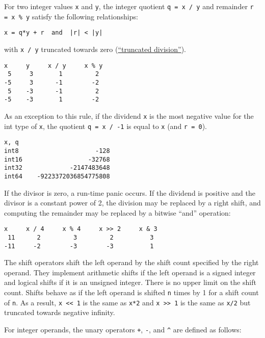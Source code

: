 For two integer values \texttt{x} and \texttt{y}, the integer quotient
\texttt{q = x / y} and remainder \texttt{r = x \% y} satisfy the
following relationships:

\begin{Verbatim}[frame=single]
x = q*y + r  and  |r| < |y|
\end{Verbatim}

with \texttt{x / y} truncated towards zero
(\href{http://en.wikipedia.org/wiki/Modulo\_operation}{``truncated
division''}).

\begin{Verbatim}[frame=single]
 x     y     x / y     x % y
 5     3       1         2
-5     3      -1        -2
 5    -3      -1         2
-5    -3       1        -2
\end{Verbatim}

As an exception to this rule, if the dividend \texttt{x} is the most
negative value for the int type of \texttt{x}, the quotient
\texttt{q = x / -1} is equal to \texttt{x} (and \texttt{r = 0}).

\begin{Verbatim}[frame=single]
             x, q
int8                     -128
int16                  -32768
int32             -2147483648
int64    -9223372036854775808
\end{Verbatim}

If the divisor is zero, a run-time panic
occurs. If the dividend is positive and the divisor is a constant power
of 2, the division may be replaced by a right shift, and computing the
remainder may be replaced by a bitwise ``and'' operation:

\begin{Verbatim}[frame=single]
 x     x / 4     x % 4     x >> 2     x & 3
 11      2         3         2          3
-11     -2        -3        -3          1
\end{Verbatim}

The shift operators shift the left operand by the shift count specified
by the right operand. They implement arithmetic shifts if the left
operand is a signed integer and logical shifts if it is an unsigned
integer. There is no upper limit on the shift count. Shifts behave as if
the left operand is shifted \texttt{n} times by 1 for a shift count of
\texttt{n}. As a result, \texttt{x \textless{}\textless{} 1} is the same
as \texttt{x*2} and \texttt{x \textgreater{}\textgreater{} 1} is the
same as \texttt{x/2} but truncated towards negative infinity.

For integer operands, the unary operators \texttt{+}, \texttt{-}, and
\texttt{\^{}} are defined as follows:

